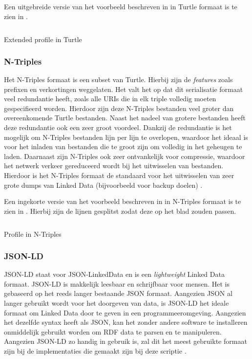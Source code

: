 Een uitgebreide versie van het voorbeeld beschreven in  in Turtle formaat is te zien in .

\begin{listing}[ht]
    \inputminted{turtle}{data/profile.ttl}
    \caption{Extended profile in Turtle}
    \label{listing:profile_turtle}
\end{listing}

\subsubsection{N-Triples}
Het N-Triples formaat is een subset van Turtle. Hierbij zijn de \textit{features} zoals prefixen en verkortingen weggelaten. Het valt het op dat dit serialisatie formaat veel redundantie heeft, zoals alle URIs die in elk triple volledig moeten gespecifieerd worden. Hierdoor zijn deze N-Triples bestanden veel groter dan overeenkomende Turtle bestanden. Naast het nadeel van grotere bestanden heeft deze redundantie ook een zeer groot voordeel. Dankzij de redundantie is het mogelijk om N-Triples bestanden lijn per lijn te overlopen, waardoor het ideaal is voor het inladen van bestanden die te groot zijn om volledig in het geheugen te laden. Daarnaast zijn N-Triples ook zeer ontvankelijk voor compressie, waardoor het netwerk verkeer gereduceerd wordt bij het uitwisselen van bestanden. Hierdoor is het N-Triples formaat de standaard voor het uitwisselen van zeer grote dumps van Linked Data (bijvoorbeeld voor backup doelen) \cite{beckett2014rdfntriples}.

Een ingekorte versie van het voorbeeld beschreven in  in N-Triples formaat is te zien in . Hierbij zijn de lijnen gesplitst zodat deze op het blad zouden passen.

\begin{listing}[ht]
    \inputminted{turtle}{data/profile_short.nt}
    \caption{Profile in N-Triples}
    \label{listing:profile_ntriples}
\end{listing}


\subsubsection{JSON-LD}
JSON-LD staat voor JSON-LinkedData en is een \textit{lightweight} Linked Data formaat. JSON-LD is makkelijk leesbaar en schrijfbaar voor mensen. Het is gebaseerd op het reeds langer bestaande JSON formaat. Aangezien JSON al langer gebruikt wordt voor het doorgeven van data, is JSON-LD het ideale formaat om Linked Data door te geven in een programmeeromgeving. Aangezien het dezelfde syntax heeft als JSON, kan het zonder andere software te installeren onmiddelijk gebruikt worden om RDF data te parsen en te manipuleren. Aangezien JSON-LD zo handig in gebruik is, zal dit het meest gebruikte formaat zijn bij de implementaties die gemaakt zijn bij deze scriptie \cite{sporny2012json}.

